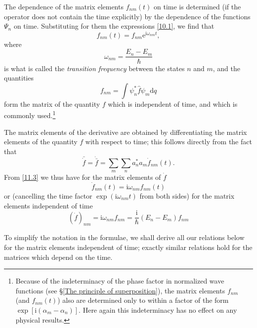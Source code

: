 The dependence of the matrix elements $ f_{nm}(t) $ on time is determined (if the operator does not contain the time explicitly) by the dependence of the functions $ \Psi_n $ on time. Substituting for them the expressions \eqref{10.1}, we find that
\begin{equation}\label{11.3}
f_{nm}(t)=f_{nm}\mathrm{e}^{\mathrm{i}\omega_{nm}t},
\end{equation}
where
\begin{equation}\label{11.4}
\omega_{nm}=\frac{E_n-E_m}{\hbar}
\end{equation}
is what is called the \textit{transition frequency} between the states $ n $ and $ m $, and the quantities
\begin{equation}\label{11.5}
f_{nm}=\int\psi_n^*\hat{f}\psi_m\mathrm{d}q
\end{equation}
form the matrix of the quantity $ f $ which is independent of time, and which is commonly used.\footnote{Because of the indeterminacy of the phase factor in normalized wave functions (see \S\ref{The principle of superposition}), the matrix elements $ f_{nm} $ (and $ f_{nm}(t) $) also are determined only to within a factor of the form $ \exp\left[\mathrm{i}(\alpha_m-\alpha_n)\right] $. Here again this indeterminacy has no effect on any physical results.
}

The matrix elements of the derivative are obtained by differentiating the matrix elements of the quantity $ f $ with respect to time; this follows directly from the fact that
\begin{equation}\label{11.6}
\bar{\dot{f}}=\dot{\bar{f}}=\sum_{m}\sum_{n}a_n^*a_m\dot{f}_{nm}(t).
\end{equation}
From \eqref{11.3} we thus have for the matrix elements of $ \dot{f} $
\begin{equation}\label{11.7}
\dot{f}_{nm}(t)=\mathrm{i}\omega_{nm}f_{nm}(t)
\end{equation}
or (cancelling the time factor $ \exp(\mathrm{i}\omega_{nm}t) $ from both sides) for the matrix elements independent of time
\begin{equation}\label{11.8}
\left(\dot{f}\right)_{nm}=\mathrm{i}\omega_{nm}f_{nm}=\frac{\mathrm{i}}{\hbar}(E_n-E_m)f_{nm}
\end{equation}

To simplify the notation in the formulae, we shall derive all our relations below for the matrix elements independent of time; exactly similar relations hold for the matrices which depend on the time.

